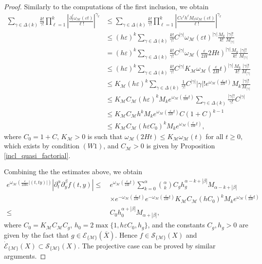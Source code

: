 \documentclass[11pt,reqno]{amsart}
\numberwithin{equation}{section}
\newcommand{\E}{{\mathcal{E}}}
\newcommand{\M}{{\mathcal{M}}} %
\begin{document}
\begin{proof}
	Similarly to the computations of the first inclusion, we obtain
	\begin{align*}
		\sum_{\gamma\in\Delta(k)}\frac{k!}{\gamma!}\prod_{\ell=1}^k\left|\frac{\partial_t^\ell \omega_\M(\varepsilon t)}{\ell!}\right|^{\gamma_\ell} & \leq \sum_{\gamma\in\Delta(k)}\frac{k!}{\gamma!}\prod_{\ell=1}^k\left|\frac{C\varepsilon^\ell h^\ell M_\ell \omega_\M(\varepsilon t)}{\ell!}\right|^{\gamma_\ell}\\
		& \leq (h\varepsilon)^k \sum_{\gamma\in\Delta(k)} \frac{k!}{\gamma!} C^{|\gamma|}\omega_\M(\varepsilon t)^{|\gamma|}\frac{M_k}{k!}\frac{|\gamma|!}{M_{|\gamma|}}\\
		& = (h \varepsilon)^k \sum_{\gamma\in\Delta(k)} \frac{k!}{\gamma!} C^{|\gamma|}\omega_\M\left(\tfrac{\varepsilon}{2H}2H t\right)^{|\gamma|}\frac{M_k}{k!}\frac{|\gamma|!}{M_{|\gamma|}}\\
		& \leq (h \varepsilon )^k\sum_{\gamma\in\Delta(k)} \frac{k!}{\gamma!} C^{|\gamma|}K_\M\omega_\M\left(\tfrac{\varepsilon}{2H} t\right)^{|\gamma|}\frac{M_k}{k!}\frac{|\gamma|!}{M_{|\gamma|}}\\
		& \leq K_\M (h\varepsilon)^k \sum_{\gamma\in\Delta(k)} \frac{1}{\gamma!} C^{|\gamma|}|\gamma|!e^{\omega_\M\left(\tfrac{\varepsilon}{2H} t\right)} M_k\frac{|\gamma|!}{M_{|\gamma|}}\\
		& \leq K_\M C_\M (h\varepsilon)^k M_k e^{\omega_\M\left(\tfrac{\varepsilon}{2H} t\right)} \sum_{\gamma\in\Delta(k)} \frac{|\gamma|!}{\gamma!} C^{|\gamma|}\\
		& \leq K_\M C_\M h^k M_k e^{\omega_\M\left(\tfrac{\varepsilon}{2H} t\right)}C(1+C)^{k-1}\\
		& \leq K_\M C_\M (h\varepsilon C_0)^k M_k e^{\omega_\M\left(\tfrac{\varepsilon}{2H} t\right)},
	\end{align*}
	where $C_0=1+C$, $K_\M>0$ is such that $\omega_\M(2Ht)\leq K_\M\omega_\M(t)$ for all $t\geq 0$, which exists by condition $(W1)$, and $C_\M>0$ is given by Proposition \ref{incl_quasi_factorial}.
	
	Combining the the estimates above, we obtain
	\begin{align*}
		e^{\omega_\M\left(\tfrac{\varepsilon}{2H\kappa}|(t,ty)|\right)}|\partial_t^\alpha\partial_y^\beta f(t,y)| \leq\ & e^{\omega_\M\left(\tfrac{\varepsilon}{2H}t\right)}  \sum_{k=0}^\alpha\binom{\alpha}{k}  C_gh_g^{\alpha-k+|\beta|}M_{\alpha-k+|\beta|} \\
		& \times e^{-\omega_\M\left(\tfrac{\varepsilon}{2H} t\right)}e^{-\omega_\M\left(\tfrac{\varepsilon}{2H} t\right)}K_\M C_\M(hC_0)^kM_ke^{\omega_\M\left(\tfrac{\varepsilon}{2H} t\right)}\\
		\leq\ & C_0 h_0^{\alpha+|\beta|} M_{\alpha+|\beta|},
	\end{align*}
	where $C_0=K_\M C_\M C_g$, $h_0 = 2\max\{1,h\varepsilon C_0,h_g\}$, and the constants $C_g,h_g>0$ are given by the fact that $g\in\E_{\{\M\}}(\overline{X})$. Hence $f\in\mathcal{S}_{\{\M\}}(X)$ and $\dot{\E}_{\{\M\}}(X) \subset\mathcal{S}_{\{\M\}}(X)$. The projective case can be proved by similar arguments.
\end{proof}
\end{document}
